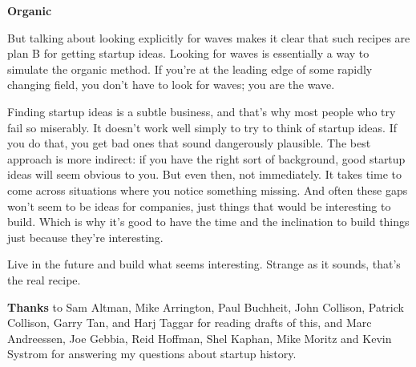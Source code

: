 \textbf{Organic}

But talking about looking explicitly for waves makes it clear that such
recipes are plan B for getting startup ideas. Looking for waves is
essentially a way to simulate the organic method. If you're at the
leading edge of some rapidly changing field, you don't have to look for
waves; you are the wave.

Finding startup ideas is a subtle business, and that's why most people
who try fail so miserably. It doesn't work well simply to try to think
of startup ideas. If you do that, you get bad ones that sound
dangerously plausible. The best approach is more indirect: if you have
the right sort of background, good startup ideas will seem obvious to
you. But even then, not immediately. It takes time to come across
situations where you notice something missing. And often these gaps
won't seem to be ideas for companies, just things that would be
interesting to build. Which is why it's good to have the time and the
inclination to build things just because they're interesting.

Live in the future and build what seems interesting. Strange as it
sounds, that's the real recipe.


\textbf{Thanks} to Sam Altman, Mike Arrington, Paul Buchheit, John
Collison, Patrick Collison, Garry Tan, and Harj Taggar for reading
drafts of this, and Marc Andreessen, Joe Gebbia, Reid Hoffman, Shel
Kaphan, Mike Moritz and Kevin Systrom for answering my questions about
startup history.